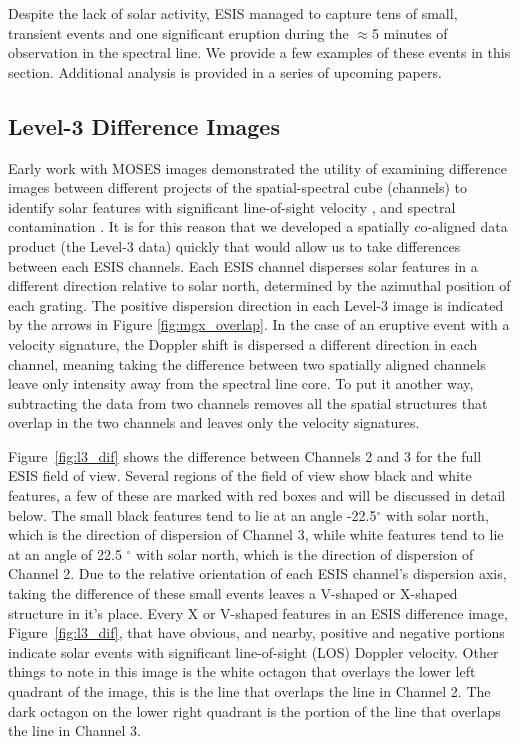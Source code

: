 	    Despite the lack of solar activity, ESIS managed to capture tens of small, transient events and one significant eruption during the $\approx$5 minutes of observation in the \ov spectral line.  We provide a few examples of these events in this section.  Additional analysis is provided in a series of upcoming papers.  
	
    \subsection{Level-3 Difference Images}
    	Early work with MOSES images demonstrated the utility of examining difference images between different projects of the spatial-spectral cube (channels) to identify solar features with significant line-of-sight velocity \citep{Fox2010,FoxPhD,RustPhD,Rust2019}, and spectral contamination \citep{RustPhD, Rust2019,Parker2021}.
    	It is for this reason that we developed a spatially co-aligned data product (the Level-3 data) quickly that would allow us to take differences between each ESIS channels.
    	Each ESIS channel disperses solar features in a different direction relative to solar north, determined by the azimuthal position of each grating.
    	The positive dispersion direction in each Level-3 image is indicated by the arrows  in Figure \ref{fig:mgx_overlap}.
    	In the case of an eruptive event with a velocity signature, the Doppler shift is dispersed a different direction in each channel, meaning taking the difference between two spatially aligned channels leave only intensity away from the spectral line core.  
    	To put it another way, subtracting the data from two channels removes all the spatial structures that overlap in the two channels and leaves only the velocity signatures. 
    	
    	Figure~\ref{fig:l3_dif} shows the difference between Channels 2 and 3 for the full ESIS field of view.  
    	Several regions of the field of view show black and white features, a few of these are marked with red boxes and will be discussed in detail below.  
    	The small black features tend to lie at an angle -22.5$^\circ$ with solar north, which is the direction of dispersion of Channel 3, while white features tend to lie at an angle of 22.5 $^\circ$ with solar north, which is the direction of dispersion of Channel 2.  
    	Due to the relative orientation of each ESIS channel's dispersion axis, taking the difference of these small events leaves a V-shaped or X-shaped structure in it's place.  
    	Every X or V-shaped features in an ESIS difference image, Figure~\ref{fig:l3_dif}, that have obvious, and nearby, positive and negative portions indicate solar events with significant line-of-sight (LOS) Doppler velocity.   
    	Other things to note in this image is the white octagon that overlays the lower left quadrant of the image, this is the \mgxbright line that overlaps the \ov line in Channel 2.  The dark octagon on the lower right quadrant is the portion of the \mgxbright line that overlaps the \ov line in Channel 3.    
   		
